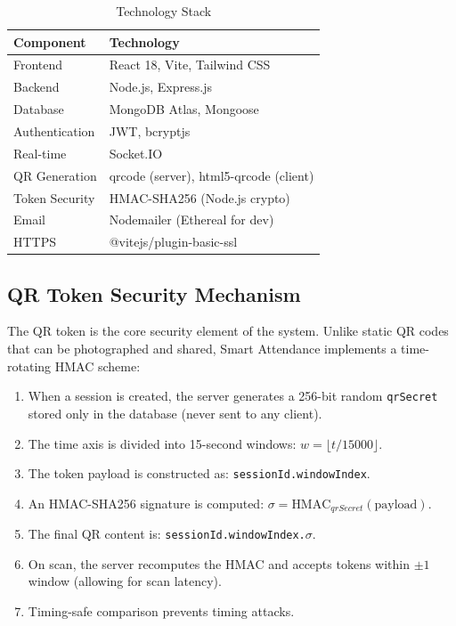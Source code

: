 \documentclass[conference]{IEEEtran}
\begin{document}
\begin{table}[htbp]
\caption{Technology Stack}
\begin{center}
\begin{tabular}{|l|l|}
\hline
\textbf{Component} & \textbf{Technology} \\
\hline
Frontend & React 18, Vite, Tailwind CSS \\
\hline
Backend & Node.js, Express.js \\
\hline
Database & MongoDB Atlas, Mongoose \\
\hline
Authentication & JWT, bcryptjs \\
\hline
Real-time & Socket.IO \\
\hline
QR Generation & qrcode (server), html5-qrcode (client) \\
\hline
Token Security & HMAC-SHA256 (Node.js crypto) \\
\hline
Email & Nodemailer (Ethereal for dev) \\
\hline
HTTPS & @vitejs/plugin-basic-ssl \\
\hline
\end{tabular}
\label{tab:stack}
\end{center}
\end{table}

\subsection{QR Token Security Mechanism}
The QR token is the core security element of the system. Unlike static QR codes that can be photographed and shared, Smart Attendance implements a time-rotating HMAC scheme:

\begin{enumerate}
\item When a session is created, the server generates a 256-bit random \texttt{qrSecret} stored only in the database (never sent to any client).
\item The time axis is divided into 15-second windows: $w = \lfloor t / 15000 \rfloor$.
\item The token payload is constructed as: \texttt{sessionId.windowIndex}.
\item An HMAC-SHA256 signature is computed: $\sigma = \text{HMAC}_{qrSecret}(\text{payload})$.
\item The final QR content is: \texttt{sessionId.windowIndex.$\sigma$}.
\item On scan, the server recomputes the HMAC and accepts tokens within $\pm 1$ window (allowing for scan latency).
\item Timing-safe comparison prevents timing attacks.
\end{enumerate}
\end{document}
